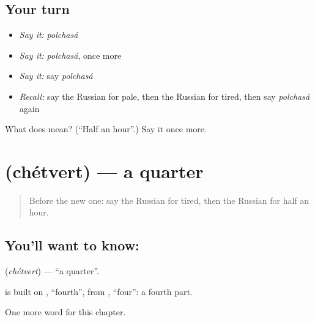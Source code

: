 \subsection*{Your turn}
\begin{itemize}
\raggedright
  \item \emph{Say it:} \emph{polchasá}
  \item \emph{Say it:} \emph{polchasá}, once more
  \item \emph{Say it:} say \emph{polchasá}
  \item \emph{Recall:} say the Russian for pale, then the Russian for tired, then say \emph{polchasá} again
\end{itemize}

\begin{tcolorbox}[breakable,colback=teal!4,colframe=teal!35!black,title={Before you move on}]
What does  mean? (\textquotedblleft{}Half an hour\textquotedblright{}.) Say it once more.
\end{tcolorbox}
\section[\texorpdfstring{\ru{четверть} (chétvert)}{четверть (chétvert)}]{ (chétvert) — a quarter}

\label{lesson:RU-C149-chetvert}



\begin{quote}
Before the new one: say the Russian for tired, then the Russian for half an hour.
\end{quote}

\subsection*{You'll want to know: }
\textbf{} (\emph{chétvert}) — \textquotedblleft{}a quarter\textquotedblright{}.

\begin{cousinweb}
\textbf{} is built on \emph{}, \textquotedblleft{}fourth\textquotedblright{}, from \emph{}, \textquotedblleft{}four\textquotedblright{}: a fourth part.
\end{cousinweb}

\begin{grammarlens}[title={What you've built}]
One more word for this chapter.
\end{grammarlens}

